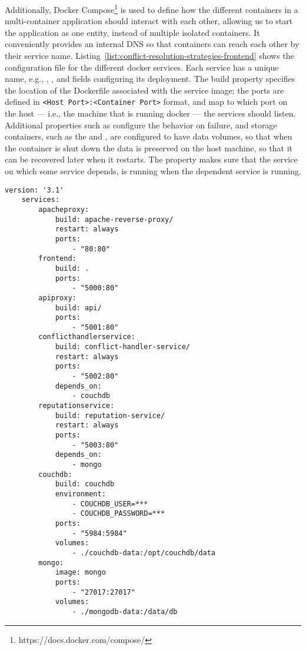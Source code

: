 Additionally, Docker Compose\footnote{https://docs.docker.com/compose/} is used to define how the different containers in a multi-container application should interact with each other, allowing us to start the application as one entity, instead of multiple isolated containers. It conveniently provides an internal DNS so that containers can reach each other by their service name. Listing~\ref{list:conflict-resolution-strategies-frontend} shows the configuration file for the different docker services. Each service has a unique name, e.g., , , and fields configuring its deployment. The build property specifies the location of the Dockerfile associated with the service image; the ports are defined in \verb+<Host Port>:<Container Port>+ format, and map to which port on the host --- i.e., the machine that is running docker --- the services should listen. Additional properties such as  configure the behavior on failure, and storage containers, such as the  and , are configured to have data volumes, so that when the container is shut down the data is preserved on the host machine, so that it can be recovered later when it restarts. The  property makes sure that the service on which some service depends, is running when the dependent service is running.

\lstset{float=H}

\begin{lstlisting}[label={lst:docker-compose-definition},caption={docker-compose.yml file --- Docker services definition}]
    version: '3.1'
    services:
        apacheproxy:
            build: apache-reverse-proxy/
            restart: always
            ports: 
                - "80:80"
        frontend: 
            build: .
            ports: 
                - "5000:80"
        apiproxy: 
            build: api/
            ports: 
                - "5001:80"
        conflicthandlerservice:
            build: conflict-handler-service/
            restart: always
            ports:
                - "5002:80"
            depends_on: 
                - couchdb
        reputationservice:
            build: reputation-service/
            restart: always
            ports:
                - "5003:80"
            depends_on: 
                - mongo
        couchdb:
            build: couchdb
            environment:
                - COUCHDB_USER=***
                - COUCHDB_PASSWORD=***
            ports:
                - "5984:5984"
            volumes: 
                - ./couchdb-data:/opt/couchdb/data
        mongo:
            image: mongo
            ports:
                - "27017:27017"
            volumes: 
                - ./mongodb-data:/data/db
\end{lstlisting}


